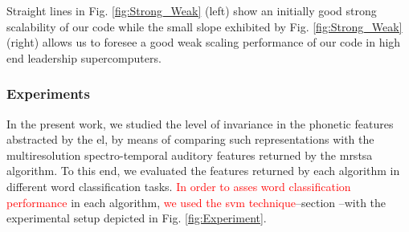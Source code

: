 \documentclass[10pt,letterpaper]{article}
\begin{document}







Straight lines in Fig. \ref{fig:Strong_Weak} (left) show an initially good strong scalability of our code while the small slope exhibited by Fig. \ref{fig:Strong_Weak} (right) allows us to foresee a good weak scaling performance of our code in high end leadership supercomputers.











\subsubsection*{Experiments}

In the present work, we studied the level of invariance in the phonetic features abstracted by the \gls{el}, by means of comparing such representations with the multiresolution spectro-temporal auditory features returned by the \gls{mrstsa} algorithm. To this end, we evaluated the features returned by each algorithm in different word classification tasks. \textcolor{red}{In order to asses word classification performance} in each algorithm, \textcolor{red}{we used the \gls{svm} technique}--section --with  the experimental setup depicted in Fig. \ref{fig:Experiment}.
\end{document}
